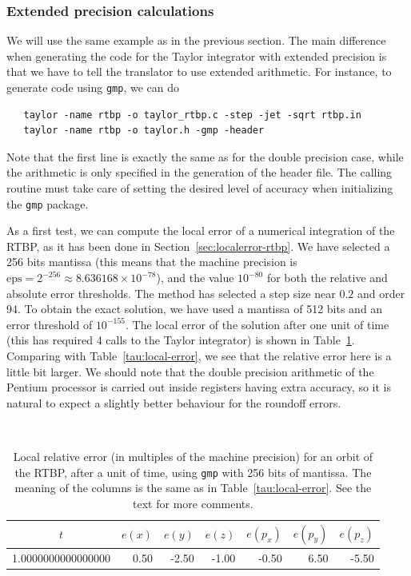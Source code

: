 \documentclass[12pt,twoside]{article}
\begin{document}
\subsubsection{Extended precision calculations}\label{sec:ex-expe}
We will use the same example as in the previous section. The main
difference when generating the code for the Taylor integrator with
extended precision is that we have to tell the translator to use
extended arithmetic. For instance, to generate code using
\texttt{gmp}, we can do
\begin{verbatim}
   taylor -name rtbp -o taylor_rtbp.c -step -jet -sqrt rtbp.in
   taylor -name rtbp -o taylor.h -gmp -header
\end{verbatim}
Note that the first line is exactly the same as for the double
precision case, while the arithmetic is only specified in the
generation of the header file. The calling routine must take care of
setting the desired level of accuracy when initializing the
\texttt{gmp} package.

As a first test, we can compute the local error of a numerical
integration of the RTBP, as it has been done in
Section~\ref{sec:localerror-rtbp}. We have selected a 256 bits
mantissa (this means that the machine precision is
$\mbox{eps}=2^{-256}\approx 8.636168\times 10^{-78}$), and the value
$10^{-80}$ for both the relative and absolute error thresholds. The
method has selected a step size near $0.2$ and order 94. To obtain the
exact solution, we have used a mantissa of 512 bits and an error
threshold of $10^{-155}$. The local error of the solution after one
unit of time (this has required 4 calls to the Taylor integrator) is
shown in Table~\ref{tau:local-error-gmp}. Comparing with
Table~\ref{tau:local-error}, we see that the relative error here is a
little bit larger. We should note that the double precision arithmetic
of the Pentium processor is carried out inside registers having extra
accuracy, so it is natural to expect a slightly better behaviour for
the roundoff errors.

\begin{table}
\begin{center}
{\tt\small
\begin{tabular}{|r|r|r|r|r|r|r|}\hline
\multicolumn{1}{|c|}{$t$} & \multicolumn{1}{c|}{$e(x)$} &
\multicolumn{1}{c|}{$e(y)$} & \multicolumn{1}{c|}{$e(z)$} &
\multicolumn{1}{c|}{$e(p_x)$} & \multicolumn{1}{c|}{$e(p_y)$} &
\multicolumn{1}{c|}{$e(p_z)$} \\ \hline
1.0000000000000000 & 0.50 & -2.50 &-1.00 & -0.50 & 6.50 & -5.50\\
\hline
\end{tabular}
}
\end{center}
\caption{Local relative error (in multiples of the machine precision)
  for an orbit of the RTBP, after a unit of time, using \texttt{gmp}
  with 256 bits of mantissa. The meaning of the columns is the same as
  in Table~\ref{tau:local-error}. See the text for more comments.}
\label{tau:local-error-gmp}
\end{table}
\end{document}

